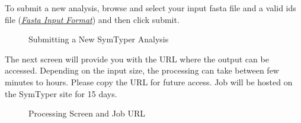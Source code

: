 \documentclass[letterpaper,10pt,english]{sphinxmanual}
\begin{document}
To submit a new analysis, browse and select your input fasta file and a valid  ids file ({\hyperref[defs:inputformat]{\emph{Fasta Input Format}}}) and then click submit.
\begin{figure}[htbp]
\centering
\capstart

\caption{Submitting a New SymTyper Analysis}\end{figure}

The next screen will provide you with the URL where the output can be accessed.
Depending on the input size, the processing can take between few minutes to hours.
Please copy the URL for future access. Job will be hosted on the SymTyper site for 15 days.
\begin{figure}[htbp]
\centering
\capstart

\caption{Processing Screen and Job URL}\end{figure}
\end{document}
